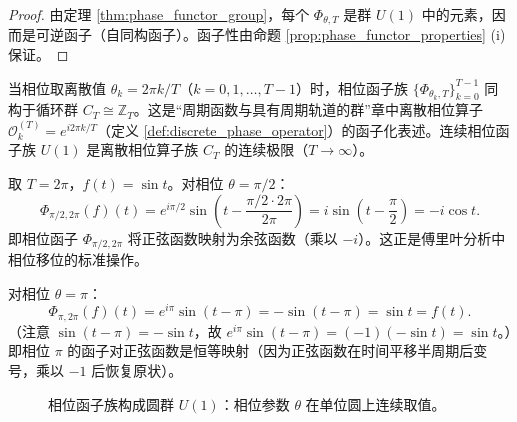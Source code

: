 \begin{proof}
由定理 \ref{thm:phase_functor_group}，每个 $\Phi_{\theta, T}$ 是群 $U(1)$ 中的元素，因而是可逆函子（自同构函子）。函子性由命题 \ref{prop:phase_functor_properties} (i) 保证。
\end{proof}

\begin{remark}[相位函子与离散相位算子]\label{rem:phase_functor_discrete}
当相位取离散值 $\theta_k = 2\pi k/T$（$k = 0, 1, \dots, T-1$）时，相位函子族 $\{\Phi_{\theta_k, T}\}_{k=0}^{T-1}$ 同构于循环群 $C_T \cong \mathbb{Z}_T$。这是“周期函数与具有周期轨道的群”章中离散相位算子 $\mathcal{O}_k^{(T)} = e^{i 2\pi k / T}$（定义 \ref{def:discrete_phase_operator}）的函子化表述。连续相位函子族 $U(1)$ 是离散相位算子族 $C_T$ 的连续极限（$T \to \infty$）。
\end{remark}

\begin{example}[相位函子的具体作用]\label{ex:phase_functor_action}
取 $T = 2\pi$，$f(t) = \sin t$。对相位 $\theta = \pi/2$：
\[
\Phi_{\pi/2, 2\pi}(f)(t) = e^{i\pi/2} \sin\!\left( t - \frac{\pi/2 \cdot 2\pi}{2\pi} \right) = i \sin\!\left( t - \frac{\pi}{2} \right) = -i \cos t.
\]
即相位函子 $\Phi_{\pi/2, 2\pi}$ 将正弦函数映射为余弦函数（乘以 $-i$）。这正是傅里叶分析中相位移位的标准操作。

对相位 $\theta = \pi$：
\[
\Phi_{\pi, 2\pi}(f)(t) = e^{i\pi} \sin(t - \pi) = -\sin(t - \pi) = \sin t = f(t).
\]
（注意 $\sin(t - \pi) = -\sin t$，故 $e^{i\pi}\sin(t-\pi) = (-1)(-\sin t) = \sin t$。）即相位 $\pi$ 的函子对正弦函数是恒等映射（因为正弦函数在时间平移半周期后变号，乘以 $-1$ 后恢复原状）。
\end{example}

\begin{figure}[htbp]
\centering
{}
\caption{相位函子族构成圆群 $U(1)$：相位参数 $\theta$ 在单位圆上连续取值。}
\label{fig:phase_functor_U1}
\end{figure}

